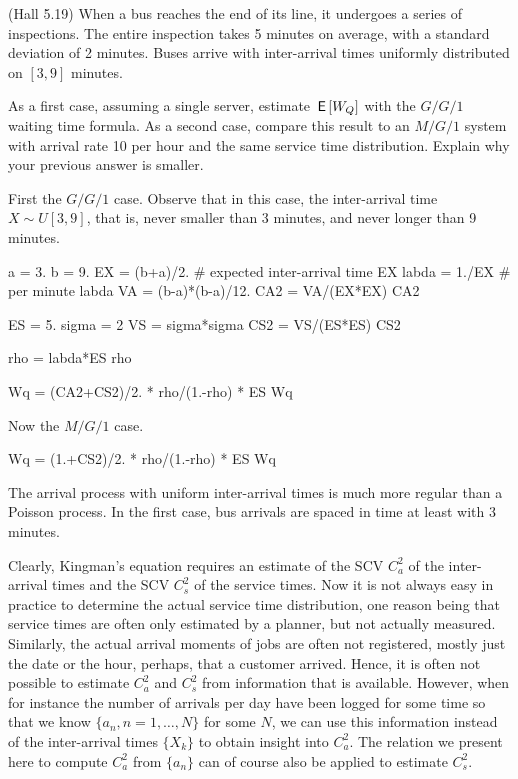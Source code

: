 \begin{exercise}
  (Hall 5.19) When a bus reaches the end of its line, it undergoes a
  series of inspections. The entire inspection takes 5 minutes on
  average, with a standard deviation of 2 minutes. Buses arrive with
  inter-arrival times uniformly distributed on $[3,9]$ minutes.

As a first case,  assuming a single server, estimate $\,\mathsf{E}\left[W_Q\right]$ with the $G/G/1$ waiting time formula. As a second case, compare this result to an $M/G/1$ system with arrival rate 10 per hour and the same service time distribution. Explain why your previous answer is smaller. 
  \begin{solution}
First the $G/G/1$ case. Observe that in this case, the inter-arrival time $X\sim U[3,9]$, that is, never smaller than 3 minutes, and never longer than 9 minutes. 

\begin{pyconsole}
  
a = 3.
b = 9. 
EX = (b+a)/2. # expected inter-arrival time
EX
labda = 1./EX # per minute
labda
VA = (b-a)*(b-a)/12.
CA2 = VA/(EX*EX)
CA2

ES = 5.
sigma = 2
VS = sigma*sigma
CS2 = VS/(ES*ES)
CS2

rho = labda*ES
rho

Wq = (CA2+CS2)/2. * rho/(1.-rho) * ES
Wq
\end{pyconsole}

Now  the $M/G/1$ case.

\begin{pyconsole}
Wq = (1.+CS2)/2. * rho/(1.-rho) * ES
Wq
\end{pyconsole}

The arrival process with uniform inter-arrival times is much more
regular than a Poisson process. In the first case, bus arrivals are
spaced in time at least with 3 minutes.
    \end{solution}
\end{exercise}



Clearly, Kingman's equation requires an estimate of the SCV $C_a^2$ of
the inter-arrival times and the SCV $C_s^2$ of the service times. Now
it is not always easy in practice to determine the actual service time
distribution, one reason being that service times are often only
estimated by a planner, but not actually measured. Similarly, the
actual arrival moments of jobs are often not registered, mostly just
the date or the hour, perhaps, that a customer arrived.  Hence, it is
often not possible to estimate $C_a^2$ and $C_s^2$ from information
that is available.  However, when for instance the number of arrivals
per day have been logged for some time so that we know
$\{a_n, n=1,\ldots, N\}$ for some $N$, we can use this information
instead of the inter-arrival times $\{X_k\}$ to obtain insight into
$C_a^2$.  The relation we present here to compute $C_a^2$ from
$\{a_n\}$ can of course also be applied to estimate $C_s^2$.

